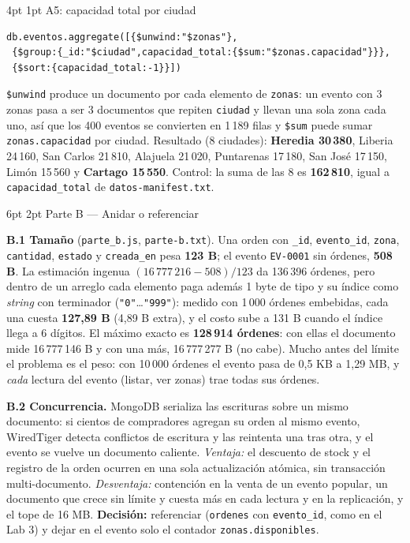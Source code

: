 \documentclass[10pt,letterpaper]{article}
\makeatletter
\renewcommand\section{\@startsection{section}{1}{\z@}%
  {6pt \@plus 2pt \@minus 1pt}{2pt}%
  {\normalfont\normalsize\bfseries\color{acc}}}
\renewcommand\subsection{\@startsection{subsection}{2}{\z@}%
  {4pt \@plus 1pt}{1pt}%
  {\normalfont\small\bfseries\color{acc}}}
\makeatother
\begin{document}
\subsection{A5: capacidad total por ciudad}

{\footnotesize\begin{verbatim}
db.eventos.aggregate([{$unwind:"$zonas"},
 {$group:{_id:"$ciudad",capacidad_total:{$sum:"$zonas.capacidad"}}},
 {$sort:{capacidad_total:-1}}])
\end{verbatim}}
\texttt{\$unwind} produce un documento por cada elemento de \texttt{zonas}: un evento con 3 zonas pasa
a ser 3 documentos que repiten \texttt{ciudad} y llevan una sola zona cada uno, así que los 400 eventos
se convierten en 1\,189 filas y \texttt{\$sum} puede sumar \texttt{zonas.capacidad} por ciudad.
Resultado (8 ciudades): \textbf{Heredia 30\,380}, Liberia 24\,160, San Carlos 21\,810, Alajuela 21\,020,
Puntarenas 17\,180, San José 17\,150, Limón 15\,560 y \textbf{Cartago 15\,550}. Control: la suma de las
8 es \textbf{162\,810}, igual a \texttt{capacidad\_total} de \texttt{datos-manifest.txt}.

\section{Parte B --- Anidar o referenciar}

\textbf{B.1 Tamaño} (\texttt{parte\_b.js}, \texttt{parte-b.txt}). Una orden con \texttt{\_id},
\texttt{evento\_id}, \texttt{zona}, \texttt{cantidad}, \texttt{estado} y \texttt{creada\_en} pesa
\textbf{123 B}; el evento \texttt{EV-0001} sin órdenes, \textbf{508 B}. La estimación ingenua
$(16\,777\,216-508)/123$ da 136\,396 órdenes, pero dentro de un arreglo cada elemento paga además
1 byte de tipo y su índice como \emph{string} con terminador (\texttt{"0"}\dots\texttt{"999"}):
medido con 1\,000 órdenes embebidas, cada una cuesta \textbf{127{,}89 B} (4{,}89 B extra), y el costo
sube a 131 B cuando el índice llega a 6 dígitos. El máximo exacto es \textbf{128\,914 órdenes}:
con ellas el documento mide 16\,777\,146 B y con una más, 16\,777\,277 B (no cabe). Mucho antes del
límite el problema es el peso: con 10\,000 órdenes el evento pasa de 0{,}5 KB a 1{,}29 MB, y
\emph{cada} lectura del evento (listar, ver zonas) trae todas sus órdenes.

\textbf{B.2 Concurrencia.} MongoDB serializa las escrituras sobre un mismo documento: si cientos de
compradores agregan su orden al mismo evento, WiredTiger detecta conflictos de escritura y las
reintenta una tras otra, y el evento se vuelve un documento caliente. \emph{Ventaja:} el descuento de
stock y el registro de la orden ocurren en una sola actualización atómica, sin transacción
multi-documento. \emph{Desventaja:} contención en la venta de un evento popular, un documento que
crece sin límite y cuesta más en cada lectura y en la replicación, y el tope de 16 MB.
\textbf{Decisión:} referenciar (\texttt{ordenes} con \texttt{evento\_id}, como en el Lab 3) y dejar
en el evento solo el contador \texttt{zonas.disponibles}.
\end{document}
